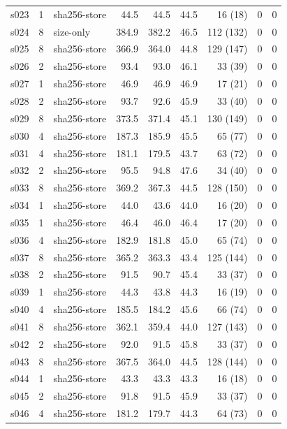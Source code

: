 \begin{tabular}{@{}lrlrrrrrr@{}}
s023 & 1 & sha256-store & 44.5 & 44.5 & 44.5 & 16 (18) & 0 & 0 \\
s024 & 8 & size-only & 384.9 & 382.2 & 46.5 & 112 (132) & 0 & 0 \\
s025 & 8 & sha256-store & 366.9 & 364.0 & 44.8 & 129 (147) & 0 & 0 \\
s026 & 2 & sha256-store & 93.4 & 93.0 & 46.1 & 33 (39) & 0 & 0 \\
s027 & 1 & sha256-store & 46.9 & 46.9 & 46.9 & 17 (21) & 0 & 0 \\
s028 & 2 & sha256-store & 93.7 & 92.6 & 45.9 & 33 (40) & 0 & 0 \\
s029 & 8 & sha256-store & 373.5 & 371.4 & 45.1 & 130 (149) & 0 & 0 \\
s030 & 4 & sha256-store & 187.3 & 185.9 & 45.5 & 65 (77) & 0 & 0 \\
s031 & 4 & sha256-store & 181.1 & 179.5 & 43.7 & 63 (72) & 0 & 0 \\
s032 & 2 & sha256-store & 95.5 & 94.8 & 47.6 & 34 (40) & 0 & 0 \\
s033 & 8 & sha256-store & 369.2 & 367.3 & 44.5 & 128 (150) & 0 & 0 \\
s034 & 1 & sha256-store & 44.0 & 43.6 & 44.0 & 16 (20) & 0 & 0 \\
s035 & 1 & sha256-store & 46.4 & 46.0 & 46.4 & 17 (20) & 0 & 0 \\
s036 & 4 & sha256-store & 182.9 & 181.8 & 45.0 & 65 (74) & 0 & 0 \\
s037 & 8 & sha256-store & 365.2 & 363.3 & 43.4 & 125 (144) & 0 & 0 \\
s038 & 2 & sha256-store & 91.5 & 90.7 & 45.4 & 33 (37) & 0 & 0 \\
s039 & 1 & sha256-store & 44.3 & 43.8 & 44.3 & 16 (19) & 0 & 0 \\
s040 & 4 & sha256-store & 185.5 & 184.2 & 45.6 & 66 (74) & 0 & 0 \\
s041 & 8 & sha256-store & 362.1 & 359.4 & 44.0 & 127 (143) & 0 & 0 \\
s042 & 2 & sha256-store & 92.0 & 91.5 & 45.8 & 33 (37) & 0 & 0 \\
s043 & 8 & sha256-store & 367.5 & 364.0 & 44.5 & 128 (144) & 0 & 0 \\
s044 & 1 & sha256-store & 43.3 & 43.3 & 43.3 & 16 (18) & 0 & 0 \\
s045 & 2 & sha256-store & 91.8 & 91.5 & 45.9 & 33 (37) & 0 & 0 \\
s046 & 4 & sha256-store & 181.2 & 179.7 & 44.3 & 64 (73) & 0 & 0 \\
\bottomrule
\end{tabular}
